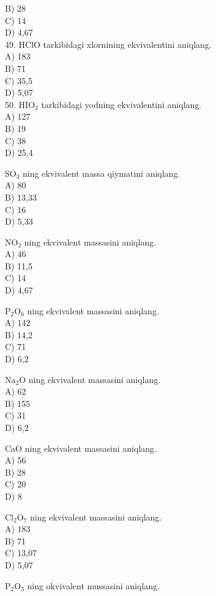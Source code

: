 B) 28\\
C) 14\\
D) 4,67\\
49. HClO tarkibidagi xlornining ekvivalentini aniqlang.\\
A) 183\\
B) 71\\
C) 35,5\\
D) 5,07\\
50. $\mathrm{HIO}_{3}$ tarkibidagi yodning ekvivalentini aniqlang.\\
A) 127\\
B) 19\\
C) 38\\
D) 25,4
  \item $\mathrm{SO}_{3}$ ning ekvivalent massa qiymatini aniqlang.\\
A) 80\\
B) 13,33\\
C) 16\\
D) 5,33\\
  \item $\mathrm{NO}_{2}$ ning ekvivalent massasini aniqlang.\\
A) 46\\
B) 11,5\\
C) 14\\
D) 4,67
  \item $\mathrm{P}_{2} \mathrm{O}_{6}$ ning ekvivalent massasini aniqlang.\\
A) 142\\
B) 14,2\\
C) 71\\
D) 6,2
  \item $\mathrm{Na}_{2} \mathrm{O}$ ning ekvivalent massasini aniqlang.\\
A) 62\\
B) 155\\
C) 31\\
D) 6,2
  \item CaO ning ekvivalent massasini aniqlang.\\
A) 56\\
B) 28\\
C) 20\\
D) 8
  \item $\mathrm{Cl}_{2} \mathrm{O}_{7}$ ning ekvivalent massasini aniqlang.\\
A) 183\\
B) 71\\
C) 13,07\\
D) 5,07
  \item $\mathrm{P}_{2} \mathrm{O}_{3}$ ning okvivalent mussasini aniqlang.\\
